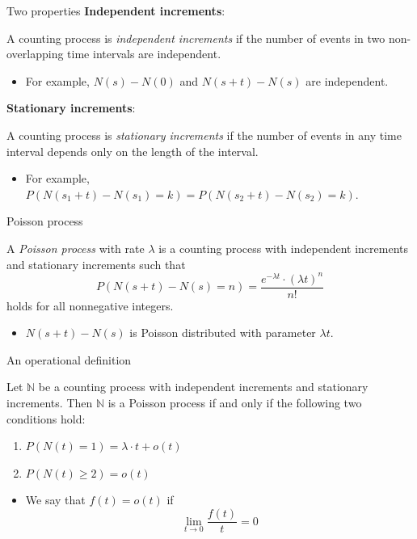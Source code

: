 \documentclass[mathserif]{beamer}
\begin{document}
\begin{frame}{Two properties}
\textbf{Independent increments}:
\begin{definition}
A counting process is \emph{independent increments} if the number of events in two non-overlapping time intervals are independent.
\end{definition}
\begin{itemize}
\item For example, $N(s) - N(0)$ and $N(s+t) - N(s)$ are independent.
\end{itemize}
\textbf{Stationary increments}:
\begin{definition}
A counting process is \emph{stationary increments} if the number of events in any time interval depends only on the  length of the interval.
\end{definition}
\begin{itemize}
\item For example, $P(N(s_1 + t) - N(s_1) = k) = P(N(s_2 + t) - N(s_2) = k)$.
\end{itemize}
\end{frame}

\begin{frame}{Poisson process}
\begin{definition}
A \emph{Poisson process} with rate $\lambda$ is a counting process with independent increments and stationary increments such that
\[
P(N(s+t)-N(s) = n) = \frac{e^{-\lambda t}\cdot (\lambda t)^n}{n!}
\]
holds for all nonnegative integers.
\end{definition}
\begin{itemize}
\item $N(s+t)-N(s)$ is Poisson distributed with parameter $\lambda t$.
\end{itemize}
\end{frame}

\begin{frame}{An operational definition}\label{operation_def}
\begin{theorem}
Let $\mathbb{N}$ be a counting process with independent increments and stationary increments.
Then $\mathbb{N}$ is a Poisson process if and only if the following two conditions hold:
\begin{enumerate}
\item $P(N(t)=1) = \lambda\cdot t + o(t)$
\item $P(N(t)\geq 2) = o(t)$
\end{enumerate}
\end{theorem}
\begin{itemize}
\item We say that $f(t)=o(t)$ if
\[
\lim_{t\to 0} \frac{f(t)}{t} = 0
\]
\end{itemize}
\end{frame}
\end{document}
